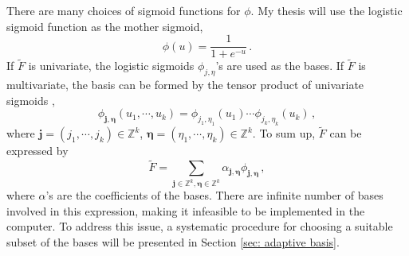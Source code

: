 There are many choices of sigmoid functions for $\phi$.
My thesis will use the logistic sigmoid function as the mother sigmoid,
\begin{equation}
    \phi(u) = \frac{1}{1+ e^{-u}}\,.
    \label{eqn: logistic sigmoid}
\end{equation}
If $\tilde{F}$ is univariate, the logistic sigmoids $\phi_{j,\eta}$'s are used as the bases.
If $\tilde{F}$ is multivariate, the basis can be formed by the tensor product 
of univariate sigmoids \cite{functional analysis},
\begin{equation}
    \phi_{\boldsymbol{j}, \boldsymbol{\eta}} (u_1, \cdots, u_k) = \phi_{j_1, \eta_1}(u_1)\cdots
    \phi_{j_k, \eta_k}(u_k)\,,
    \label{eqn: tensor basis}
\end{equation}
where $\boldsymbol{j}=(j_1, \cdots, j_k)\in \mathbb{Z}^k$, 
$\boldsymbol{\eta} = (\eta_1, \cdots, \eta_k) \in \mathbb{Z}^k$. To sum up,
$\tilde{F}$ can be expressed by
\begin{equation}
    \tilde{F} = \sum_{\boldsymbol{j}\in \mathbb{Z}^k, \boldsymbol{\eta}\in \mathbb{Z}^k} 
                       \alpha_{\boldsymbol{j}, \boldsymbol{\eta}}
                       \phi_{\boldsymbol{j}, \boldsymbol{\eta}}\,,
    \label{eqn: linear expansion}
\end{equation}
where $\alpha$'s are the coefficients of the bases. There are infinite number of bases involved
in this expression, making it infeasible to be implemented in the computer. To address this issue,
a systematic procedure for choosing
a suitable subset of the bases %
will be presented in Section \ref{sec: adaptive basis}.
\\

